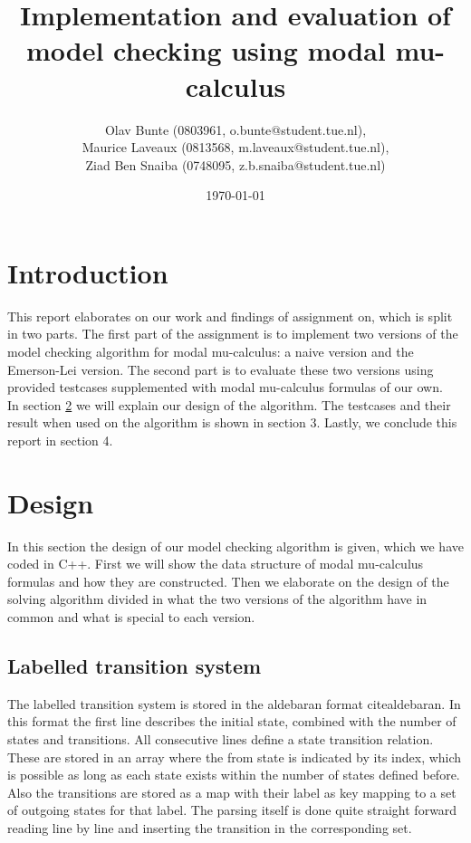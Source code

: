 \documentclass[10pt,a4paper]{article}
\title{Implementation and evaluation of model checking using modal mu-calculus}
\author{Olav Bunte (0803961, o.bunte@student.tue.nl),\\
Maurice Laveaux (0813568, m.laveaux@student.tue.nl),\\
Ziad Ben Snaiba (0748095, z.b.snaiba@student.tue.nl)}
\date{\today}
\begin{document}
\maketitle

\section{Introduction}
This report elaborates on our work and findings of assignment on, which is split in two parts. The first part of the assignment is to implement two versions of the model checking algorithm for modal mu-calculus: a naive version and the Emerson-Lei version. The second part is to evaluate these two versions using provided testcases supplemented with modal mu-calculus formulas of our own.\\
In section \ref{design} we will explain our design of the algorithm. The testcases and their result when used on the algorithm is shown in section 3. Lastly, we conclude this report in section 4.

\section{Design}\label{design}
In this section the design of our model checking algorithm is given, which we have coded in C++. First we will show the data structure of modal mu-calculus formulas and how they are constructed. Then we elaborate on the design of the solving algorithm divided in what the two versions of the algorithm have in common and what is special to each version.

\subsection{Labelled transition system}
The labelled transition system is stored in the aldebaran format cite{aldebaran}. In this format the first line describes the initial state, combined with the number of states and transitions. All consecutive lines define a state transition relation. These are stored in an array where the from state is indicated by its index, which is possible as long as each state exists within the number of states defined before. Also the transitions are stored as a map with their label as key mapping to a set of outgoing states for that label. The parsing itself is done quite straight forward reading line by line and inserting the transition in the corresponding set.
\end{document}
